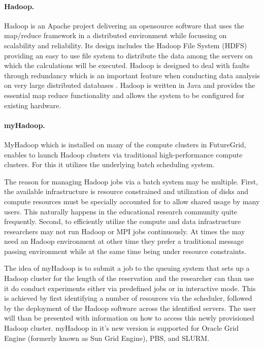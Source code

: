 \paragraph{Hadoop.}\label{S:hadoop}

Hadoop \cite{report/myhadoop}\cite{myhadoop2} is an Apache project
delivering an opensource software that uses the map/reduce framework
in a distributed environment while focussing on scalability and
reliability. Its design includes the Hadoop File System (HDFS) providing an
easy to use file system to distribute the data among the servers on
which the calculations will be executed. Hadoop is designed to deal
with faults through redundancy which is an important feature when
conducting data analysis on very large distributed databases
\cite{www/hadoop}.  Hadoop is written in Java and provides the
essential map reduce functionality and allows the system to be
configured for existing hardware.

\paragraph{myHadoop.}

MyHadoop which is installed on many of the compute clusters in
FutureGrid, enables to launch Hadoop clusters via traditional
high-performance compute clusters. For this it utilizes the underlying
batch scheduling system. 

The reason for managing Hadoop jobs via a batch system may be
multiple. First, the available infrastructure is resource constrained
and utilization of disks and compute resources must be specially
accounted for to allow shared usage by many users. This naturally
happens in the educational research community quite frequently. 
Second, to efficiently utilize the compute and data infrastructure
researchers may not run Hadoop or MPI jobs continuously. At times the
may need an Hadoop environment at other time they prefer a traditional
message passing environment while at the same time being under
resource constraints.

The idea of myHadoop is to submit a job to the queuing system that
sets up a Hadoop cluster for the length of the reservation and the
researcher can than use it do conduct experiments either via
predefined jobs or in interactive mode. This is achieved by first
identifying a number of resources via the scheduler, followed by the
deployment of the Hadoop software across the identified servers. The
user will than be presented with information on how to access this
newly provisioned Hadoop cluster. myHadoop in it's new version
\cite{myhadoop2} is supported for Oracle Grid Engine (formerly known
as Sun Grid Engine), PBS, and SLURM. 

